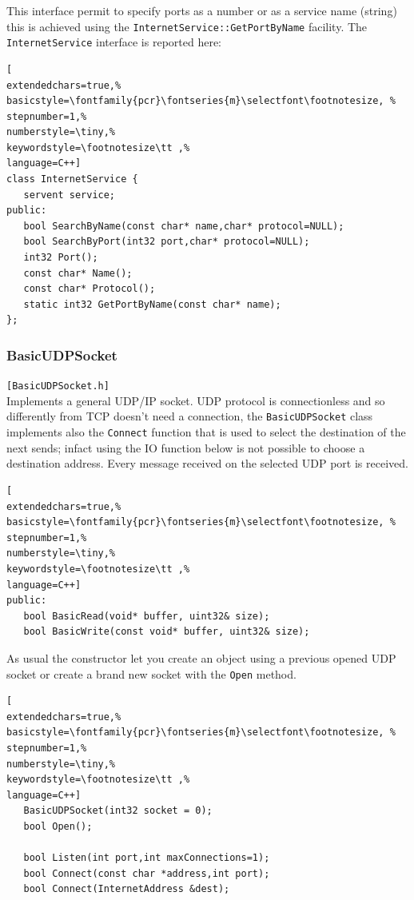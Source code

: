 This interface permit to specify ports as a number or as a service name (string) this is achieved using the \texttt{InternetService::GetPortByName} facility. The \texttt{InternetService} interface is reported here:

\begin{lstlisting}[
extendedchars=true,%
basicstyle=\fontfamily{pcr}\fontseries{m}\selectfont\footnotesize, %
stepnumber=1,%
numberstyle=\tiny,%
keywordstyle=\footnotesize\tt ,%
language=C++]
class InternetService {
   servent service;
public:
   bool SearchByName(const char* name,char* protocol=NULL);
   bool SearchByPort(int32 port,char* protocol=NULL);
   int32 Port();
   const char* Name();
   const char* Protocol();
   static int32 GetPortByName(const char* name);
};
\end{lstlisting}



\subsubsection{BasicUDPSocket}
\texttt{[BasicUDPSocket.h]}\\
Implements a general UDP/IP socket. UDP protocol is connectionless and so differently from TCP doesn't need a connection, the \texttt{BasicUDPSocket} class implements also the \texttt{Connect} function that is used to select the destination of the next sends; infact using the IO function below is not possible to choose a destination address. Every message received on the selected UDP port is received.

\begin{lstlisting}[
extendedchars=true,%
basicstyle=\fontfamily{pcr}\fontseries{m}\selectfont\footnotesize, %
stepnumber=1,%
numberstyle=\tiny,%
keywordstyle=\footnotesize\tt ,%
language=C++]
public:
   bool BasicRead(void* buffer, uint32& size);
   bool BasicWrite(const void* buffer, uint32& size);
\end{lstlisting}

As usual the constructor let you create an object using a previous opened UDP socket or create a brand new socket with the \texttt{Open} method.

\begin{lstlisting}[
extendedchars=true,%
basicstyle=\fontfamily{pcr}\fontseries{m}\selectfont\footnotesize, %
stepnumber=1,%
numberstyle=\tiny,%
keywordstyle=\footnotesize\tt ,%
language=C++]
   BasicUDPSocket(int32 socket = 0);
   bool Open();

   bool Listen(int port,int maxConnections=1);
   bool Connect(const char *address,int port);
   bool Connect(InternetAddress &dest);
\end{lstlisting}



